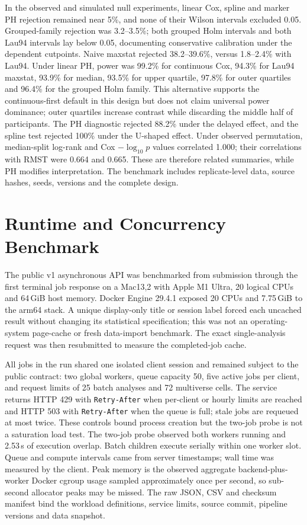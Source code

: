 \documentclass[12pt]{article}
\begin{document}
In the observed and simulated null experiments, linear Cox, spline and marker
PH rejection remained near 5\%, and none of their Wilson intervals excluded
0.05. Grouped-family rejection was 3.2--3.5\%; both grouped Holm intervals and
both Lau94 intervals lay below 0.05, documenting conservative calibration
under the dependent cutpoints. Naive maxstat rejected 38.2--39.6\%, versus
1.8--2.4\% with Lau94. Under linear PH, power was 99.2\% for continuous Cox,
94.3\% for Lau94 maxstat, 93.9\% for median, 93.5\% for upper quartile,
97.8\% for outer quartiles and 96.4\% for the grouped Holm family. This
alternative supports the continuous-first default in this design but does not
claim universal power dominance; outer quartiles increase contrast while
discarding the middle half of participants. The PH diagnostic rejected 88.2\%
under the delayed effect, and the spline test rejected 100\% under the U-shaped
effect. Under observed permutation, median-split log-rank and Cox
\(-\log_{10}p\) values correlated 1.000; their correlations with RMST were
0.664 and 0.665. These are therefore related summaries, while PH modifies
interpretation. The benchmark includes replicate-level data, source hashes,
seeds, versions and the complete design.


\endgroup

\begingroup
{}
\section*{Runtime and Concurrency Benchmark}

The public v1 asynchronous API was benchmarked from submission through the
first terminal job response on a Mac13,2 with Apple M1 Ultra, 20 logical CPUs
and 64\,GiB host memory. Docker Engine 29.4.1 exposed 20 CPUs and 7.75\,GiB to
the arm64 stack. A unique display-only title or session label forced each
uncached result without changing its statistical specification; this was not
an operating-system page-cache or fresh data-import benchmark. The exact
single-analysis request was then resubmitted to measure the completed-job
cache.

All jobs in the run shared one isolated client session and remained subject to
the public contract: two global workers, queue capacity 50, five active jobs
per client, and request limits of 25 batch analyses and 72 multiverse cells.
The service returns HTTP 429 with \texttt{Retry-After} when per-client or
hourly limits are reached and HTTP 503 with \texttt{Retry-After} when the queue
is full; stale jobs are requeued at most twice. These controls bound process
creation but the two-job probe is not a saturation load test.
The two-job probe observed both workers running and 2.53\,s of execution
overlap. Batch children execute serially within one worker slot. Queue and
compute intervals came from server timestamps; wall time was measured by the
client. Peak memory is the observed aggregate backend-plus-worker Docker
cgroup usage sampled approximately once per second, so sub-second allocator
peaks may be missed. The raw JSON, CSV and checksum manifest bind the workload
definitions, service limits, source commit, pipeline versions and data
snapshot.


\endgroup

\clearpage
\begingroup
\singlespacing
\small


\endgroup
\end{document}
